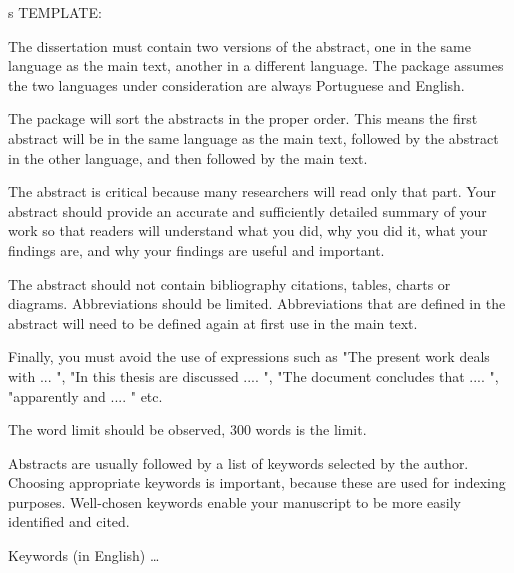 \abstractEN %



s
TEMPLATE:


The dissertation must contain two versions of the abstract, one in the same language as the main text, another in a different language. The package assumes the two languages under consideration are always Portuguese and English.

The package will sort the abstracts in the proper order. This means the first abstract will be in the same language as the main text, followed by the abstract in the other language, and then followed by the main text.

The abstract is critical because many researchers will read only that part. Your abstract should provide an accurate and sufficiently detailed summary of your work so that readers will understand what you did, why you did it, what your findings are, and why your findings are useful and important.

The abstract should not contain bibliography citations, tables, charts or diagrams. Abbreviations should be limited. Abbreviations that are defined in the abstract will need to be defined again at first use in the main text.

Finally, you must avoid the use of expressions such as "The present work deals with ... ", "In this thesis are discussed .... ", "The document concludes that .... ", "apparently and .... " etc.

The word limit should be observed, 300 words is the limit.

Abstracts are usually followed by a list of keywords selected by the author. Choosing appropriate keywords is important, because these are used for indexing purposes. Well-chosen keywords enable your manuscript to be more easily identified and cited.

\begin{keywords}
    Keywords (in English) \ldots
\end{keywords} 

